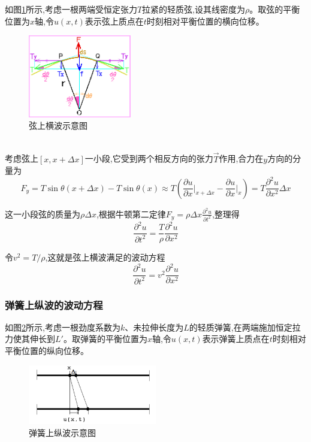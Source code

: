 \documentclass[UTF8]{ctexart}
\begin{document}
如图\ref{fig:string_wave}所示,考虑一根两端受恒定张力$T$拉紧的轻质弦,设其线密度为$\rho$。取弦的平衡位置为$x$轴,令$u(x,t)$表示弦上质点在$t$时刻相对平衡位置的横向位移。
\\
\begin{figure}[htbp]
\centering
\includegraphics[width=0.4\textwidth]{string_wave.png}
\caption{弦上横波示意图}
\label{fig:string_wave}
\end{figure}
\\
考虑弦上$[x, x+\Delta x]$一小段,它受到两个相反方向的张力$\vec{T}$作用,合力在$y$方向的分量为
\begin{equation}
F_y = T\sin\theta(x+\Delta x) - T\sin\theta(x) \approx T\left(\frac{\partial u}{\partial x}\bigg|_{x+\Delta x} - \frac{\partial u}{\partial x}\bigg|_x\right) = T\frac{\partial^2u}{\partial x^2}\Delta x
\end{equation}

这一小段弦的质量为$\rho\Delta x$,根据牛顿第二定律$F_y = \rho\Delta x \frac{\partial^2u}{\partial t^2}$,整理得
\begin{equation}
\frac{\partial^2u}{\partial t^2} = \frac{T}{\rho}\frac{\partial^2u}{\partial x^2}
\end{equation}

令$v^2 = T/\rho$,这就是弦上横波满足的波动方程
\begin{equation}
\frac{\partial^2u}{\partial t^2} = v^2\frac{\partial^2u}{\partial x^2}
\label{eq:wave_eq_string}
\end{equation}

\subsubsection{弹簧上纵波的波动方程}

如图\ref{fig:spring_wave}所示,考虑一根劲度系数为$k$、未拉伸长度为$L$的轻质弹簧,在两端施加恒定拉力使其伸长到$L'$。取弹簧的平衡位置为$x$轴,令$u(x,t)$表示弹簧上质点在$t$时刻相对平衡位置的纵向位移。
\\
\begin{figure}[htbp]
\centering
\includegraphics[width=0.5\textwidth]{spring_wave.png}
\caption{弹簧上纵波示意图}
\label{fig:spring_wave}
\end{figure}
\end{document}
